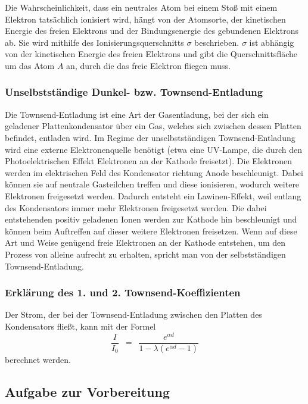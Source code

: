\documentclass{article}
\newcommand{\widespace}{\enspace}
\newcommand{\wideeq}{\widespace = \widespace}
\begin{document}
Die Wahrscheinlichkeit, dass ein neutrales Atom bei einem Stoß mit einem Elektron
tatsächlich ionisiert wird, hängt von der Atomsorte, der kinetischen Energie des
freien Elektrons und der Bindungsenergie des gebundenen Elektrons ab.
Sie wird mithilfe des Ionisierungsquerschnitts $\sigma$ beschrieben.
$\sigma$ ist abhängig von der kinetischen Energie des freien Elektrons und gibt
die Querschnittsfläche um das Atom $A$ an, durch die das freie Elektron
fliegen muss.

\cite[34--35]{demtröder}


\subsubsection{Unselbstständige Dunkel- bzw. Townsend-Entladung}

Die Townsend-Entladung ist eine Art der Gasentladung, bei der sich ein geladener
Plattenkondensator über ein Gas, welches sich zwischen dessen Platten befindet,
entladen wird. Im Regime der unselbstständigen Townsend-Entladung
wird eine externe Elektronenquelle benötigt (etwa eine UV-Lampe, die durch den
Photoelektrischen Effekt Elektronen an der Kathode freisetzt).
Die Elektronen werden im elektrischen Feld des Kondensator richtung Anode
beschleunigt. Dabei können sie auf neutrale Gasteilchen treffen und diese
ionisieren, wodurch weitere Elektronen freigesetzt werden.
Dadurch entsteht ein Lawinen-Effekt, weil entlang des Kondensators immer mehr
Elektronen freigesetzt werden.
Die dabei entstehenden positiv geladenen Ionen werden zur Kathode hin beschleunigt
und können beim Auftreffen auf dieser weitere Elektronen freisetzen.
Wenn auf diese Art und Weise genügend freie Elektronen an der Kathode entstehen,
um den Prozess von alleine aufrecht zu erhalten, spricht man von der selbstständigen
Townsend-Entladung.

\cite[18--21]{koubek}


\subsubsection{Erklärung des 1. und 2. Townsend-Koeffizienten}

Der Strom, der bei der Townsend-Entladung zwischen den Platten des Kondensators
fließt, kann mit der Formel
\[
    \frac{I}{I_0} \wideeq
    \frac{
        e^{\alpha d}
    }{
        1 - \lambda (e^{\alpha d} - 1)
    }
\]
berechnet werden.

\cite[18--21]{koubek}


\subsection{Aufgabe zur Vorbereitung}
\end{document}
